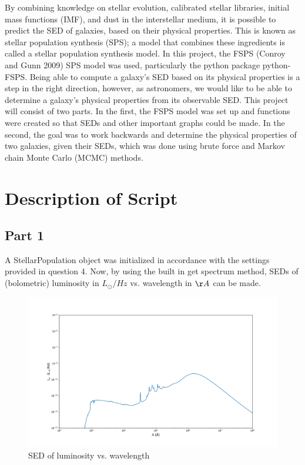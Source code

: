 \documentclass{article}
\begin{document}
By combining knowledge on stellar evolution, calibrated stellar libraries, initial mass functions
(IMF), and dust in the interstellar medium, it is possible to predict the SED of galaxies, based on
their physical properties. This is known as stellar population synthesis (SPS); a model that
combines these ingredients is called a stellar population synthesis model. In this project,
the FSPS (Conroy and Gunn 2009) SPS model was used, particularly the python package python-FSPS.
Being able to compute a galaxy's SED based on its physical properties is a step in the right direction,
however, as astronomers, we would like to be able to determine a galaxy's physical properties from
its observable SED. This project will consist of two parts. In the first, the FSPS model was set up
and functions were created so that SEDs and other important graphs could be made. In the second,
the goal was to work backwards and determine the physical properties of two galaxies, given their SEDs, which was done using
brute force and Markov chain Monte Carlo (MCMC) methods.

\section*{Description of Script}
\subsection*{Part 1}

A StellarPopulation object was initialized in accordance with the settings provided in question 4.
Now, by using the built in get spectrum method, SEDs of (bolometric) luminosity in $L_\odot/Hz$
vs. wavelength in $\AA$ can be made.

\begin{figure}[h]
  \centering
\includegraphics[scale=0.3]{SED Default Units}
\caption{SED of luminosity vs. wavelength}
\end{figure}
\end{document}
